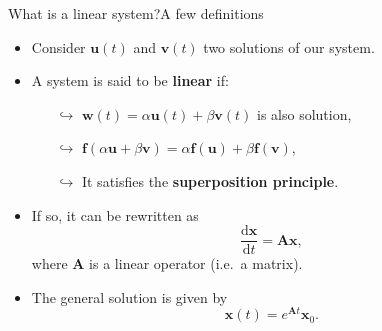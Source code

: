 \documentclass[usenames,dvipsnames,svgnames,10pt,aspectratio=169]{beamer}
\begin{document}
\begin{frame}[t, c]{What is a linear system?}{A few definitions}
	\begin{itemize}
		\item Consider \(\bm{u}(t)\) and \(\bm{v}(t)\) two solutions of our system.

		\medskip

		\item A system is said to be \alert{\textbf{linear}} if:
		\begin{itemize}
			\item[\( \hookrightarrow \)] \(\bm{w}(t) = \alpha \bm{u}(t) + \beta \bm{v}(t) \) is also solution,
			\item[\( \hookrightarrow \)] \(\bm{f}\left(	\alpha \bm{u} + \beta \bm{v} \right) = \alpha \bm{f}(\bm{u}) + \beta \bm{f}(\bm{v}) \),
			\item[\( \hookrightarrow \)] It satisfies the \alert{\textbf{superposition principle}}.
		\end{itemize}

		\item If so, it can be rewritten as
		\[
			\frac{\mathrm{d}\bm{x}}{\mathrm{d}t} = \bm{Ax},
		\]
		where \( \bm{A} \) is a linear operator (i.e.\ a matrix).

		\medskip

		\item The general solution is given by
		\[
			\bm{x}(t) = e^{\bm{A}t} \bm{x}_0.
		\]
	\end{itemize}
	\vspace{1cm}
\end{frame}
\end{document}
